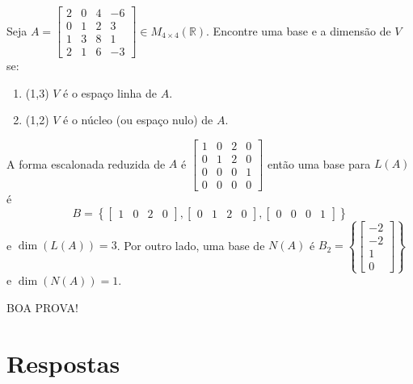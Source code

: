 \documentclass[12pt,a4paper]{article}
\newcommand*\R{\mathbb{R}}
\begin{document}
\begin{ExerciseList}
\Exercise[title={2,5}] Seja $A = \begin{bmatrix}
2 & 0 & 4 & -6\\
0 & 1 & 2 &  3\\
1 & 3 & 8 &  1\\
2 & 1 & 6 & -3
\end{bmatrix} \in M_{4\times 4}(\R)$. Encontre uma base e a dimensão de $V$ se:
\begin{enumerate}
\item (1,3) $V$ é o espaço linha de $A$.
\item (1,2) $V$ é o núcleo (ou espaço nulo) de $A$.
\end{enumerate}

\Answer  A forma escalonada reduzida de $A$ é $\begin{bmatrix}
1 & 0 & 2 & 0 \\
0 & 1 & 2 & 0 \\
0 & 0 & 0 & 1 \\
0 & 0 & 0 & 0
\end{bmatrix}$ então uma base para $L(A)$ é
\[
B =
\left\{
\begin{bmatrix}
1 & 0 & 2 & 0
\end{bmatrix},
\begin{bmatrix}
0 & 1 & 2 & 0
\end{bmatrix},
\begin{bmatrix}
0 & 0 & 0 & 1
\end{bmatrix}
\right\}
\]
e $\dim( L(A) ) = 3$. Por outro lado, uma base de $N(A)$ é $B_2 =
\left\{
\begin{bmatrix}
-2\\-2\\1\\0
\end{bmatrix}
\right\}$ e $\dim( N(A) ) = 1$.
\end{ExerciseList}

\begin{center}
BOA PROVA!
\end{center}

\newpage
\restoregeometry
\section*{Respostas}
\shipoutAnswer
\end{document}
